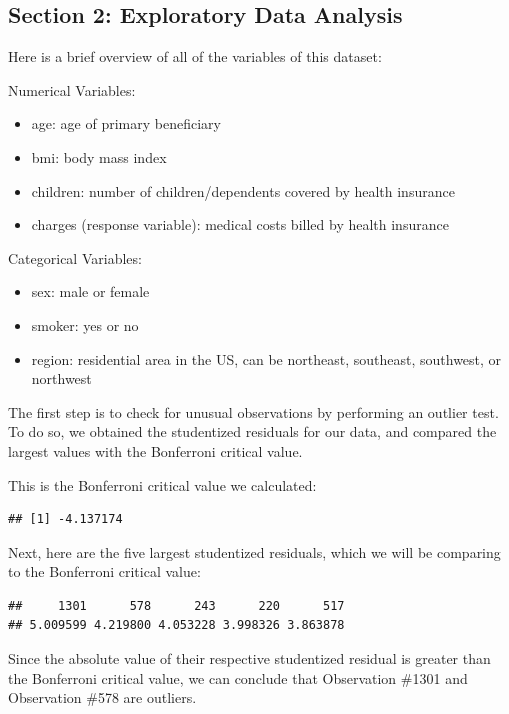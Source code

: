 \documentclass[
  12pt,
]{article}
\providecommand{\tightlist}{%
  \setlength{\itemsep}{0pt}\setlength{\parskip}{0pt}}
\begin{document}
\newpage

\subsection{Section 2: Exploratory Data
Analysis}\label{section-2-exploratory-data-analysis}

Here is a brief overview of all of the variables of this dataset:

Numerical Variables:

\begin{itemize}
\tightlist
\item
  age: age of primary beneficiary
\item
  bmi: body mass index
\item
  children: number of children/dependents covered by health insurance
\item
  charges (response variable): medical costs billed by health insurance
\end{itemize}

Categorical Variables:

\begin{itemize}
\tightlist
\item
  sex: male or female
\item
  smoker: yes or no
\item
  region: residential area in the US, can be northeast, southeast,
  southwest, or northwest
\end{itemize}

The first step is to check for unusual observations by performing an
outlier test. To do so, we obtained the studentized residuals for our
data, and compared the largest values with the Bonferroni critical
value.

This is the Bonferroni critical value we calculated:

\begin{verbatim}
## [1] -4.137174
\end{verbatim}

Next, here are the five largest studentized residuals, which we will be
comparing to the Bonferroni critical value:

\begin{verbatim}
##     1301      578      243      220      517 
## 5.009599 4.219800 4.053228 3.998326 3.863878
\end{verbatim}

Since the absolute value of their respective studentized residual is
greater than the Bonferroni critical value, we can conclude that
Observation \#1301 and Observation \#578 are outliers.
\end{document}
